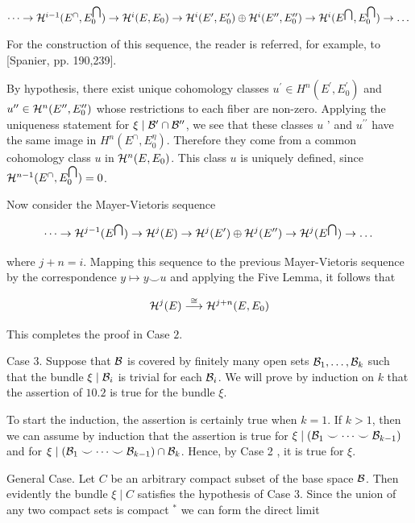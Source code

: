 $\dots \rightarrow \mathcal{H}^{i-1}(E^{\cap}, E_{0}^{\bigcap}) \rightarrow \mathcal{H}^{i}(E, E_{0}) \rightarrow \mathcal{H}^{i}(E^{\prime}, E_{0}^{\prime}) \oplus \mathcal{H}^{i}(E^{\prime \prime}, E_{0}^{\prime \prime}) \rightarrow \mathcal{H}^{i}(E^{\bigcap}, E_{0}^{\bigcap}) \rightarrow \dots$

For the construction of this sequence, the reader is referred, for example, to [Spanier, pp. 190,239$]$.

By hypothesis, there exist unique cohomology classes $u^{\prime} \in H^{ n }(E^{\prime}, E_{0}^{\prime})$ and $u^{\prime \prime} \in  \mathcal{H}^{ n }(E^{\prime \prime}, E_{0}^{\prime \prime})$ whose restrictions to each fiber are non-zero. Applying the uniqueness statement for $\xi \mid \mathcal{B}^{\prime} \cap \mathcal{B}^{\prime \prime}$, we see that these classes $u$ ' and $u^{\prime \prime}$ have the same image in $H^{n}(E^{\cap}, E_{0}^{\eta})$. Therefore they come from a common cohomology class $u$ in $\mathcal{H}^{ n }(E, E_{0})$. This class $u$ is uniquely defined, since $\mathcal{H}^{ n -1}(E^{\cap}, E_{0}^{\bigcap})=0$.

Now consider the Mayer-Vietoris sequence

\[
\dots \rightarrow \mathcal{H}^{j-1}(E^{\bigcap}) \rightarrow \mathcal{H}^{j}(E) \rightarrow \mathcal{H}^{j}(E^{\prime}) \oplus \mathcal{H}^{j}(E^{\prime \prime}) \rightarrow \mathcal{H}^{j}(E^{\bigcap}) \rightarrow \dots
\]

where $j+ n =i$. Mapping this sequence to the previous Mayer-Vietoris sequence by the correspondence $ y  \mapsto  y  \smile u$ and applying the Five Lemma, it follows that

\[
\mathcal{H}^{j}(E) \stackrel{\cong}{\longrightarrow} \mathcal{H}^{j+ n }(E, E_{0})
\]

This completes the proof in Case $2$.

Case 3. Suppose that $\mathcal{B}$ is covered by finitely many open sets $\mathcal{B}_{1}, \dots, \mathcal{B}_{k}$ such that the bundle $\xi \mid \mathcal{B}_{i}$ is trivial for each $\mathcal{B}_{i}$. We will prove by induction on $k$ that the assertion of $10.2$ is true for the bundle $\xi$.

To start the induction, the assertion is certainly true when $k=1$. If $k>1$, then we can assume by induction that the assertion is true for $\xi \mid(\mathcal{B}_{1} \smile \dots \smile \mathcal{B}_{k-1})$ and for $\xi \mid(\mathcal{B}_{1} \smile \dots \smile \mathcal{B}_{k-1}) \cap \mathcal{B}_{k}$. Hence, by Case 2 , it is true for $\xi$.

General Case. Let $C$ be an arbitrary compact subset of the base space $\mathcal{B}$. Then evidently the bundle $\xi \mid C$ satisfies the hypothesis of Case 3. Since the union of any two compact sets is compact $^{*}$ we can form the direct limit

